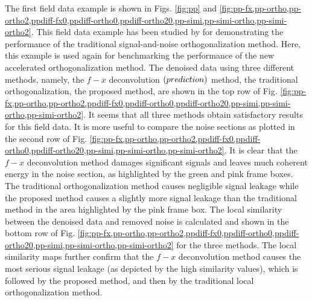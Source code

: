 The first field data example is shown in Figs. \ref{fig:pp} and \ref{fig:pp-fx,pp-ortho,pp-ortho2,ppdiff-fx0,ppdiff-ortho0,ppdiff-ortho20,pp-simi,pp-simi-ortho,pp-simi-ortho2}. This field data example has been studied by \cite{yangkang2015ortho} for demonstrating the performance of the traditional signal-and-noise orthogonalization method. Here, this example is used again for benchmarking the performance of the new accelerated orthogonalization method. The denoised data using three different methods, namely, the $f-x$ deconvolution $(prediction)$ method, the traditional orthogonalization, the proposed method, are shown in the top row of Fig. \ref{fig:pp-fx,pp-ortho,pp-ortho2,ppdiff-fx0,ppdiff-ortho0,ppdiff-ortho20,pp-simi,pp-simi-ortho,pp-simi-ortho2}. It seems that all three methods obtain satisfactory results for this field data. It is more useful to compare the noise sections as plotted in the second row of Fig. \ref{fig:pp-fx,pp-ortho,pp-ortho2,ppdiff-fx0,ppdiff-ortho0,ppdiff-ortho20,pp-simi,pp-simi-ortho,pp-simi-ortho2}. It is clear that the $f-x$ deconvolution method damages significant signals and leaves much coherent energy in the noise section, as highlighted by the green and pink frame boxes. The traditional orthogonalization method causes negligible signal leakage while the proposed method causes a slightly more signal leakage than the traditional method in the area highlighted by the pink frame box. The local similarity between the denoised data and removed noise is calculated and shown in the bottom row of Fig. \ref{fig:pp-fx,pp-ortho,pp-ortho2,ppdiff-fx0,ppdiff-ortho0,ppdiff-ortho20,pp-simi,pp-simi-ortho,pp-simi-ortho2} for the three methods. The local similarity maps further confirm that the $f-x$ deconvolution method causes the most serious signal leakage (as depicted by the high similarity values), which is followed by the proposed method, and then by the traditional local orthogonalization method. 

